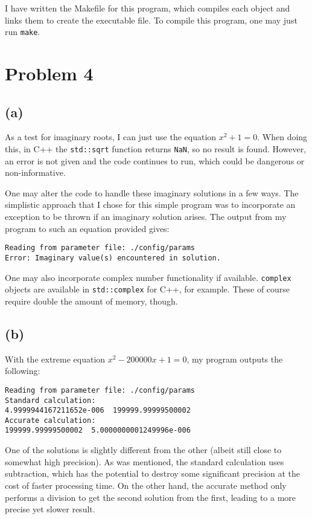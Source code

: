 \documentclass[12pt]{article}
\begin{document}
I have written the Makefile for this program, which compiles each object and
links them to create the executable file. To compile this program, one may just
run \texttt{make}.

\section*{Problem 4}

\subsection*{(a)}

As a test for imaginary roots, I can just use the equation $x^2 + 1 = 0$. When
doing this, in C++ the \texttt{std::sqrt} function returns \texttt{NaN}, so no
result is found. However, an error is not given and the code continues to run,
which could be dangerous or non-informative.

One may alter the code to handle these imaginary solutions in a few ways. The
simplistic approach that I chose for this simple program was to incorporate an
exception to be thrown if an imaginary solution arises. The output from my
program to such an equation provided gives:
\begin{verbatim}
Reading from parameter file: ./config/params
Error: Imaginary value(s) encountered in solution.
\end{verbatim}

One may also incorporate complex number functionality if available.
\texttt{complex} objects are available in \texttt{std::complex} for C++, for
example. These of course require double the amount of memory, though.

\subsection*{(b)}

With the extreme equation $x^2 - 200000x + 1 = 0$, my program outputs the
following:
\begin{verbatim}
Reading from parameter file: ./config/params
Standard calculation:
4.9999944167211652e-006  199999.99999500002
Accurate calculation:
199999.99999500002  5.0000000001249996e-006
\end{verbatim}
One of the solutions is slightly different from the other (albeit still close
to somewhat high precision). As was mentioned, the standard calculation uses
subtraction, which has the potential to destroy some significant precision at
the cost of faster processing time. On the other hand, the accurate method only
performs a division to get the second solution from the first, leading to a
more precise yet slower result.
\end{document}
